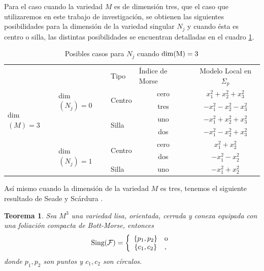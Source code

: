 \documentclass[a4paper,10pt]{book}
\newtheorem{teo}{Teorema}[chapter]
\begin{document}
Para el caso cuando la variedad $M$ es de dimensi\'on tres, que el caso que utilizaremos en este trabajo de investigaci\'on, se obtienen las siguientes posibilidades para la dimensi\'on de la variedad singular $N_{j}$ y cuando \'esta es centro o silla, las distintas posibilidades  se encuentran detalladas en el cuadro \ref{tabla1}.
\begin{table}[!ht]
\centering
\begin{tabular}{|l|l|l|c|c|}
\hline
\multirow{8}{*}{dim$(M)=3$} & \multirow{5}{*}{dim$(N_{j})=0$} & Tipo                   & \multicolumn{1}{l|}{\'Indice de Morse} & Modelo Local en $\Sigma_{p}$      \\ \cline{3-5} 
                            &                                 & \multirow{2}{*}{Centro} & cero                             & $x_{1}^{2}+x_{2}^{2}+x_{3}^{2}$  \\ \cline{4-5} 
                            &                                 &                         & tres                            & $-x_{1}^{2}-x_{2}^{2}-x_{3}^{2}$ \\ \cline{3-5} 
                            &                                 & \multirow{2}{*}{Silla} & uno                              & $-x_{1}^{2}+x_{2}^{2}+x_{3}^{2}$ \\ \cline{4-5} 
                            &                                 &                         & dos                             & $-x_{1}^{2}-x_{2}^{2}+x_{3}^{2}$ \\ \cline{2-5} 
                            & \multirow{3}{*}{dim$(N_{j})=1$} & \multirow{2}{*}{Centro} & cero                             & $x_{1}^{2}+x_{2}^{2}$            \\ \cline{4-5} 
                            &                                 &                         & dos                             & $-x_{1}^{2}-x_{2}^{2}$           \\ \cline{3-5} 
                            &                                 & Silla                  & uno                              & $-x_{1}^{2}+x_{2}^{2}$           \\ \hline
\end{tabular}
\caption{Posibles casos para $N_{j}$ cuando ${\rm dim(M)=3}$}
\label{tabla1}
\end{table}

As\'i mismo cuando la dimensi\'on de la variedad $M$ es tres, tenemos el siguiente resultado de Seade y Sc\'ardura \cite{Seade1}.
\begin{teo}\label{teoPepe}
Sea $M^{3}$ una variedad lisa, orientada, cerrada y conexa equipada con una foliaci\'on compacta de Bott-Morse, entonces 
$${\rm Sing(\mathcal{F})} = \left\{ \begin{array}{cl}
                                    \{p_{1},p_{2}\}  &  {\rm o} \\ 
                                    \{c_{1}, c_{2}\} & , 
                                    \end{array} 
                                    \right.$$
donde $p_{1}, p_{2}$ son puntos y $c_{1}, c_{2}$ son c\'irculos.
\end{teo}
\end{document}
